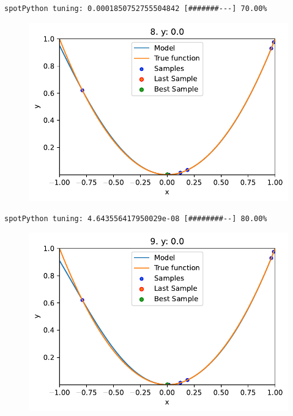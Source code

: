 \documentclass[
  letterpaper,
  DIV=11,
  numbers=noendperiod]{scrreprt}
\begin{document}
\begin{verbatim}
spotPython tuning: 0.0001850752755504842 [#######---] 70.00% 
\end{verbatim}

\begin{figure}[H]

{\centering \includegraphics{010_num_spot_sklearn_surrogate_files/figure-pdf/cell-21-output-10.pdf}

}

\end{figure}

\begin{verbatim}
spotPython tuning: 4.643556417950029e-08 [########--] 80.00% 
\end{verbatim}

\begin{figure}[H]

{\centering \includegraphics{010_num_spot_sklearn_surrogate_files/figure-pdf/cell-21-output-12.pdf}

}

\end{figure}
\end{document}
